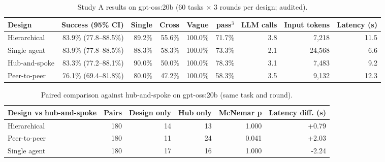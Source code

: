\documentclass[11pt,a4paper]{article}
\begin{document}
\begin{table}[H]
\centering
\footnotesize
\caption{Study A results on gpt-oss:20b (60 tasks $\times$ 3 rounds per design; audited).}\label{tab:a-oss}
\begin{tabular}{lrrrrrrrr}
\toprule
\textbf{Design} & \textbf{Success (95\% CI)} & \textbf{Single} & \textbf{Cross} & \textbf{Vague} & \textbf{pass$^{3}$} & \textbf{LLM calls} & \textbf{Input tokens} & \textbf{Latency (s)} \\
\midrule
Hierarchical & 83.9\% (77.8--88.5\%) & 89.2\% & 55.6\% & 100.0\% & 71.7\% & 3.8 & 7,218 & 11.5 \\
Single agent & 83.9\% (77.8--88.5\%) & 88.3\% & 58.3\% & 100.0\% & 73.3\% & 2.1 & 24,568 & 6.6 \\
Hub-and-spoke & 83.3\% (77.2--88.1\%) & 90.0\% & 50.0\% & 100.0\% & 78.3\% & 3.1 & 7,483 & 9.2 \\
Peer-to-peer & 76.1\% (69.4--81.8\%) & 80.0\% & 47.2\% & 100.0\% & 58.3\% & 3.5 & 9,132 & 12.3 \\
\bottomrule
\end{tabular}
\end{table}

\begin{table}[H]
\centering
\small
\caption{Paired comparison against hub-and-spoke on gpt-oss:20b (same task and round).}\label{tab:a-cmp-oss}
\begin{tabular}{lrrrrr}
\toprule
\textbf{Design vs hub-and-spoke} & \textbf{Pairs} & \textbf{Design only} & \textbf{Hub only} & \textbf{McNemar p} & \textbf{Latency diff. (s)} \\
\midrule
Hierarchical & 180 & 14 & 13 & 1.000 & +0.79 \\
Peer-to-peer & 180 & 11 & 24 & 0.041 & +2.03 \\
Single agent & 180 & 17 & 16 & 1.000 & -2.24 \\
\bottomrule
\end{tabular}
\end{table}
\end{document}
